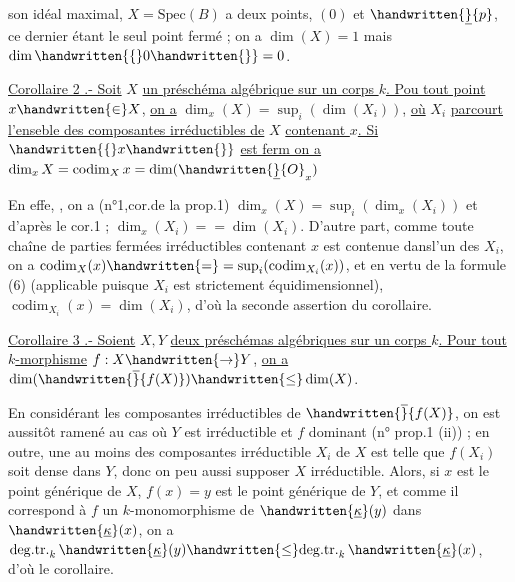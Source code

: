 son idéal maximal, $X=\mathrm{Spec}(B)$ a deux points, $(0)$ et $\handwritten{\underline}{p}$, ce dernier étant le seul point fermé ; on a $\dim(X)=1$ mais $\dim\handwritten{\{}0\handwritten{\}}=0$.

\uline{Corollaire 2 .- Soit} $X$ \uline{un préschéma algébrique sur un corps $k$. Pou tout point} $x\handwritten{\in}X$, \uline{on a} $\dim_x(X)=\sup_i(\dim(X_i))$\handwritten{\unsure{,|$^\circ$}}, \uline{où} $X_i$ \uline{parcourt l'enseble des composantes irréductibles de} $X$ \uline{contenant $x$. Si} $\handwritten{\{}x\handwritten{\}}$ \uline{est ferm on a} $\dim_x X=\operatorname{codim}_X x=\dim(\handwritten{\underline}{O}_x)$\handwritten{,} 

En effe, , on a (n°1,cor.de la prop.1) $\dim_x(X)=\sup_i(\dim_x(X_i))$ et  d'après le cor.1 ; $\dim_x(X_i)=\allowbreak=\dim(X_i)$. D'autre part, comme  toute chaîne de parties fermées irréductibles contenant $x$ est contenue dans\handwritten{\,}l'un des $X_i$, on a $\operatorname{codim}_X(x)\handwritten{=}\allowbreak=\sup_i(\operatorname{codim}_{X_i}(x))$, et en vertu de la formule (6) (applicable puisque $X_i$ est strictement équidimensionnel), $\operatorname{codim}_{X_i}(x)=\dim(X_i)$, d'où  la seconde assertion du corollaire.

\uline{Corollaire 3 .- Soient} $X,Y$ \uline{deux préschémas algébriques sur un corps $k$. Pour tout $k$-morphisme} $f:X\handwritten{\to}Y$, \uline{on a} $\dim(\handwritten{\overline}{f(X)})\handwritten{\leq}\dim(X)$.

En considérant les composantes irréductibles de $\handwritten{\overline}{f(X)}$, on est aussitôt ramené au cas où  $Y$ est irréductible et $f$ dominant (n° prop.1 (ii)) ; en outre, une au moins des composantes irréductible $X_i$ de $X$ est telle  que  $f(X_i)$ soit dense  dans $Y$, donc on peu aussi supposer $X$ irréductible. Alors, si $x$ est le point générique de $X$, $f(x)=y$ est le point générique de $Y$, et comme il  correspond à $f$ un $k$-monomorphisme de $\handwritten{\underline{\kappa}}(y)$ dans $\handwritten{\underline{\kappa}}(x)$, on a  $\mathrm{deg.tr.}_k\,\handwritten{\underline{\kappa}}(y)\handwritten{\leq}\mathrm{deg.tr.}_k\,\handwritten{\underline{\kappa}}(x)$, d'où le corollaire.

